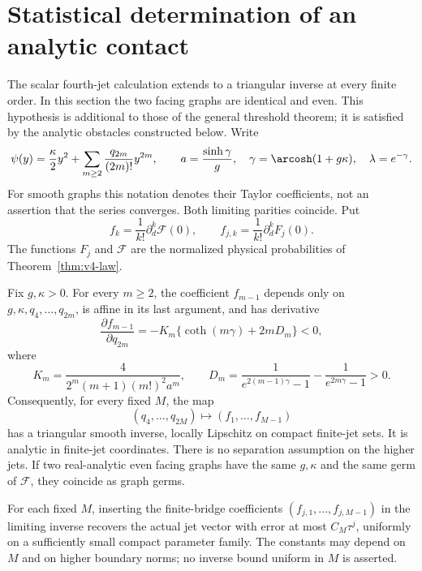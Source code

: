 \section{Statistical determination of an analytic contact}
\label{sec:v5-jets}
The scalar fourth-jet calculation extends to a triangular inverse at every
finite order. In this section the two facing graphs are identical and even.
This hypothesis is additional to those of the general threshold theorem;
it is satisfied by the analytic obstacles constructed below. Write
\begin{equation}\label{eq:v5-graph-series}
 \psi(y)=\frac\kappa2y^2+\sum_{m\ge2}\frac{q_{2m}}{(2m)!}y^{2m},
 \qquad a=\frac{\sinh\gamma}{g},\quad
 \gamma=\arcosh(1+g\kappa),\quad \lambda=e^{-\gamma}.
\end{equation}
For smooth graphs this notation denotes their Taylor coefficients, not an
assertion that the series converges. Both limiting parities coincide. Put
\[
 f_k=\frac1{k!}\partial_d^k\mathcal F(0),\qquad
 f_{j,k}=\frac1{k!}\partial_d^kF_j(0).
\]
The functions $F_j$ and $\mathcal F$ are the normalized physical
probabilities of Theorem~\ref{thm:v4-law}.

\begin{theorem}\label{thm:v5-jets}
Fix $g,\kappa>0$. For every $m\ge2$, the coefficient $f_{m-1}$ depends
only on $g,\kappa,q_4,\ldots,q_{2m}$, is affine in its last argument,
and has derivative
\begin{equation}\label{eq:v5-diagonal}
 \frac{\partial f_{m-1}}{\partial q_{2m}}
 =-K_m\{\coth(m\gamma)+2mD_m\}<0,
\end{equation}
where
\begin{equation}\label{eq:v5-constants}
 K_m=\frac{4}{2^m(m+1)(m!)^2a^m},\qquad
 D_m=\frac1{e^{2(m-1)\gamma}-1}
             -\frac1{e^{2m\gamma}-1}>0.
\end{equation}
Consequently, for every fixed $M$, the map
\[
 (q_4,\ldots,q_{2M})\longmapsto(f_1,\ldots,f_{M-1})
\]
has a triangular smooth inverse, locally Lipschitz on compact finite-jet
sets. It is analytic in finite-jet coordinates. There is no separation
assumption on the higher jets. If two real-analytic even facing graphs
have the same $g,\kappa$ and the same germ of $\mathcal F$, they coincide
as graph germs.

For each fixed $M$, inserting the finite-bridge coefficients
$(f_{j,1},\ldots,f_{j,M-1})$ in the limiting inverse recovers the actual
jet vector with error at most $C_M\tau^j$, uniformly on a sufficiently
small compact parameter family. The constants may depend on $M$ and on
higher boundary norms; no inverse bound uniform in $M$ is asserted.
\end{theorem}

